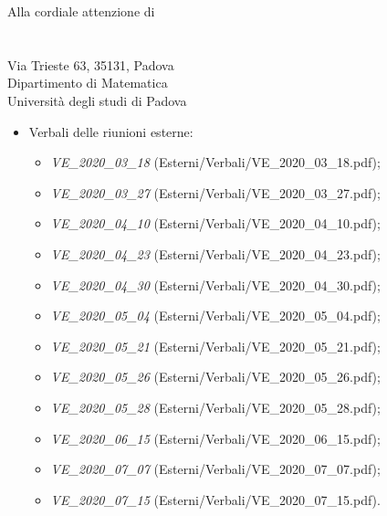 \documentclass[a4paper]{letter}
\begin{document}
\begin{letter} {Alla cordiale attenzione di \\ \TV \\ \RC \\ Via Trieste 63, 35131, Padova\\ Dipartimento di Matematica \\ Università degli studi di Padova }
\begin{itemize}
\begin{itemize}
				\item \textit{VI\_2020\_06\_22} (Interni/Verbali/VI\_2020\_06\_22.pdf);
				\item \textit{VI\_2020\_06\_26} (Interni/Verbali/VI\_2020\_06\_26.pdf);
				\item \textit{VI\_2020\_07\_02} (Interni/Verbali/VI\_2020\_07\_02.pdf);
				\item \textit{VI\_2020\_07\_06} (Interni/Verbali/VI\_2020\_07\_06.pdf);
				\item \textit{VI\_2020\_07\_13} (Interni/Verbali/VI\_2020\_07\_13.pdf);
				\item \textit{VI\_2020\_07\_15} (Interni/Verbali/VI\_2020\_07\_15.pdf).
      \end{itemize}
    \item Verbali delle riunioni esterne:
      \begin{itemize}
      				\item \textit{VE\_2020\_03\_18} (Esterni/Verbali/VE\_2020\_03\_18.pdf);
				\item \textit{VE\_2020\_03\_27} (Esterni/Verbali/VE\_2020\_03\_27.pdf);
				\item \textit{VE\_2020\_04\_10} (Esterni/Verbali/VE\_2020\_04\_10.pdf);
				\item \textit{VE\_2020\_04\_23} (Esterni/Verbali/VE\_2020\_04\_23.pdf);
				\item \textit{VE\_2020\_04\_30} (Esterni/Verbali/VE\_2020\_04\_30.pdf);
				\item \textit{VE\_2020\_05\_04} (Esterni/Verbali/VE\_2020\_05\_04.pdf);
				\item \textit{VE\_2020\_05\_21} (Esterni/Verbali/VE\_2020\_05\_21.pdf);
				\item \textit{VE\_2020\_05\_26} (Esterni/Verbali/VE\_2020\_05\_26.pdf);
				\item \textit{VE\_2020\_05\_28} (Esterni/Verbali/VE\_2020\_05\_28.pdf);
				\item \textit{VE\_2020\_06\_15} (Esterni/Verbali/VE\_2020\_06\_15.pdf);
				\item \textit{VE\_2020\_07\_07} (Esterni/Verbali/VE\_2020\_07\_07.pdf);
				\item \textit{VE\_2020\_07\_15} (Esterni/Verbali/VE\_2020\_07\_15.pdf).
      \end{itemize}
  \end{itemize}


\end{letter}
\end{document}
